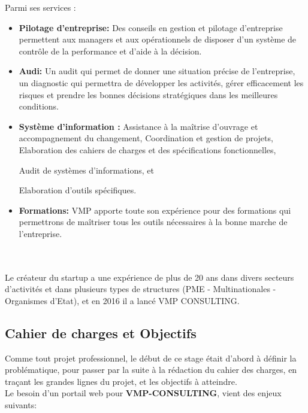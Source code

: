 \documentclass[12pt]{article}
\begin{document}
Parmi ses services :
\begin{itemize}

\item \textbf{Pilotage d'entreprise: } Des conseils en gestion et pilotage d'entreprise permettent aux managers et aux opérationnels de disposer d’un système de contrôle de la performance et d’aide à la décision.


\item \textbf{Audi: } Un audit qui permet de donner une situation précise de l'entreprise, un
diagnostic qui  permettra de développer les activités, gérer efficacement les risques et prendre les bonnes décisions stratégiques dans les meilleures conditions.


\item \textbf{Système d'information : }  Assistance à la maîtrise d’ouvrage et accompagnement du changement,
 Coordination et gestion de projets, 
 Elaboration des cahiers de charges et des spécifications fonctionnelles, 

 Audit de systèmes d’informations, et

Elaboration d’outils spécifiques.


\item \textbf{Formations: } VMP apporte toute son expérience pour des formations qui permettrons de maîtriser tous les outils nécessaires à la bonne marche de l'entreprise.
\end{itemize}
\\ \\ 



Le créateur du startup a une expérience de plus de 20 ans dans divers secteurs d'activités et dans plusieurs types de structures (PME - Multinationales - Organismes d'Etat), et en 2016 il a lancé VMP CONSULTING.




\subsection{Cahier de charges et Objectifs}

Comme tout projet professionnel, le début de ce stage était d'abord à définir la 
problématique,  pour passer par la suite à la rédaction du cahier des charges, en 
traçant  les grandes lignes du projet, et les objectifs à atteindre.\\ 

Le besoin d'un portail web pour \textbf{VMP-CONSULTING}, vient des enjeux suivants: \\
\end{document}
